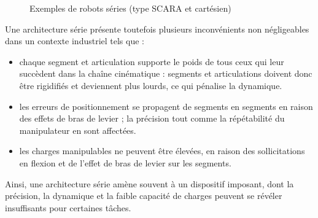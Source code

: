 \begin{figure}[!ht]
  \centering
\hfill
    \caption{\footnotesize{Exemples de robots séries (type SCARA et 
cart\'esien)}}
\label{intro:fig2}
\end{figure}

Une architecture série présente toutefois plusieurs inconvénients non 
négli\-gea\-bles dans un contexte industriel tels que :
\begin{itemize}
 \item chaque segment et articulation supporte le poids de tous ceux qui leur 
succèdent dans la chaîne cinématique : segments et articulations doivent donc 
être rigidifiés et deviennent plus lourds, ce qui pénalise la dynamique.
 \item les erreurs de positionnement se propagent de segments en segments en 
raison des effets de bras de levier ; la précision tout comme la répétabilité du 
manipulateur en sont affectées.
 \item les charges manipulables ne peuvent être \'elev\'ees, en raison des 
sollicitations en flexion et de l'effet de bras de levier sur les segments.
\end{itemize}

Ainsi, une architecture série am\`ene souvent \`a un dispositif imposant, dont 
la précision, la dynamique et la faible capacité de charges peuvent se 
r\'ev\'eler insuffisants pour certaines tâches.

